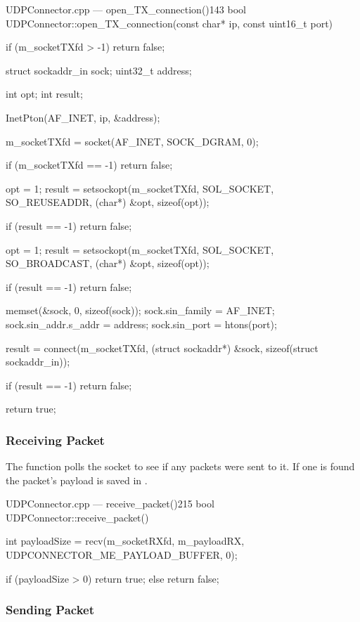 \begin{codelist}{UDPConnector.cpp --- open\_TX\_connection()}{143}
bool UDPConnector::open_TX_connection(const char* ip, const uint16_t port) {
    if (m_socketTXfd > -1)
        return false;

    struct sockaddr_in sock;
    uint32_t address;

    int opt;
    int result;

    InetPton(AF_INET, ip, &address);

    m_socketTXfd = socket(AF_INET, SOCK_DGRAM, 0);

    if (m_socketTXfd == -1)
        return false;

    opt = 1;
    result = setsockopt(m_socketTXfd, SOL_SOCKET, SO_REUSEADDR, (char*) &opt, sizeof(opt));

    if (result == -1)
        return false;

    opt = 1;
    result = setsockopt(m_socketTXfd, SOL_SOCKET, SO_BROADCAST, (char*) &opt, sizeof(opt));

    if (result == -1)
        return false;

    memset(&sock, 0, sizeof(sock));
    sock.sin_family      = AF_INET;
    sock.sin_addr.s_addr = address;
    sock.sin_port        = htons(port);

    result = connect(m_socketTXfd, (struct sockaddr*) &sock, sizeof(struct sockaddr_in));

    if (result == -1)
        return false;

    return true;
}
\end{codelist}

\subsubsection{Receiving Packet}

The  function polls the socket to see if any \glspl{packet} were sent to it. If one is found the \gls{packet}'s \gls{payload} is saved in .

\begin{codelist}{UDPConnector.cpp --- receive\_packet()}{215}
bool UDPConnector::receive_packet() {
    int payloadSize = recv(m_socketRXfd, m_payloadRX, UDPCONNECTOR_ME_PAYLOAD_BUFFER, 0);

	if (payloadSize > 0)
	    return true;
    else
        return false;
}
\end{codelist}

\subsubsection{Sending Packet}

